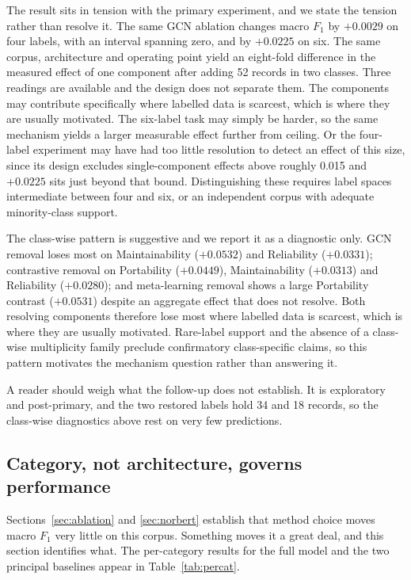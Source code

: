 \documentclass[11pt,a4paper]{article}
\begin{document}
The result sits in tension with the primary experiment, and we state the tension rather than resolve it.
The same GCN ablation changes macro $F_1$ by $+0.0029$ on four labels, with an interval spanning zero, and
by $+0.0225$ on six. The same corpus, architecture and operating point yield an eight-fold difference in
the measured effect of one component after adding 52 records in two classes. Three readings are available
and the design does not separate them. The components may contribute specifically where labelled data is
scarcest, which is where they are usually motivated. The six-label task may simply be harder, so the same
mechanism yields a larger measurable effect further from ceiling. Or the four-label experiment may have had
too little resolution to detect an effect of this size, since its design excludes single-component effects
above roughly 0.015 and $+0.0225$ sits just beyond that bound. Distinguishing these requires label spaces
intermediate between four and six, or an independent corpus with adequate minority-class support.

The class-wise pattern is suggestive and we report it as a diagnostic only. GCN removal loses most on
Maintainability ($+0.0532$) and Reliability ($+0.0331$); contrastive removal on Portability ($+0.0449$),
Maintainability ($+0.0313$) and Reliability ($+0.0280$); and meta-learning removal shows a large Portability
contrast ($+0.0531$) despite an aggregate effect that does not resolve. Both resolving components therefore
lose most where labelled data is scarcest, which is where they are usually motivated. Rare-label support
and the absence of a class-wise multiplicity family preclude confirmatory class-specific claims, so this
pattern motivates the mechanism question rather than answering it.

A reader should weigh what the follow-up does not establish. It is exploratory and post-primary, and the
two restored labels hold 34 and 18 records, so the class-wise diagnostics above rest on very few
predictions.

\subsection{Category, not architecture, governs performance}
\label{sec:support}

Sections~\ref{sec:ablation} and \ref{sec:norbert} establish that method choice moves macro
$F_1$ very little on this corpus. Something moves it a great deal, and this section identifies
what. The per-category results for the full model and the two principal baselines appear in
Table~\ref{tab:percat}.
\end{document}
